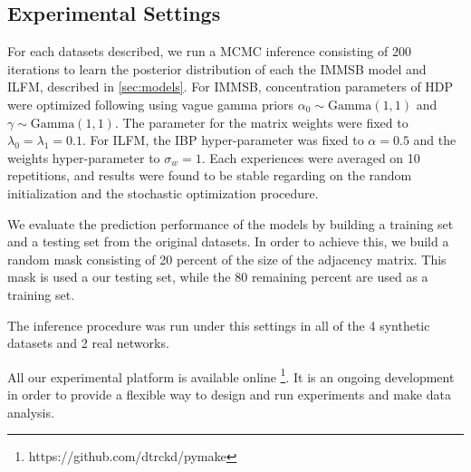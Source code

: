 \subsection{Experimental Settings}
For each datasets described,  we run a MCMC inference consisting of 200 iterations to learn the posterior distribution of each the IMMSB model and ILFM, described in \ref{sec:models}. For IMMSB, concentration parameters of HDP were optimized following \cite{HDP} using vague gamma priors $\alpha_0 \sim \text{Gamma}(1,1)$ and       $\gamma \sim \text{Gamma}(1,1)$. The parameter for the matrix weights were fixed to $\lambda_0=\lambda_1=0.1$. For ILFM, the IBP hyper-parameter was fixed to   $\alpha=0.5$ and the weights hyper-parameter to $\sigma_w = 1$. Each experiences were averaged on 10 repetitions, and results were found to be stable regarding on the random  initialization and the stochastic optimization procedure. 
 

We evaluate the  prediction performance of the models by building a training set and a testing set from the original datasets. In order to achieve this, we build a random mask consisting of 20 percent of the size of the adjacency matrix. This mask is used a our testing set, while the 80 remaining percent are used as a training set.

The inference procedure was run under this settings in all of the 4 synthetic datasets and 2 real networks.

All our experimental platform is available online \footnote{https://github.com/dtrckd/pymake}. It is an ongoing development in order to provide a flexible way to design and run experiments and make data analysis.


